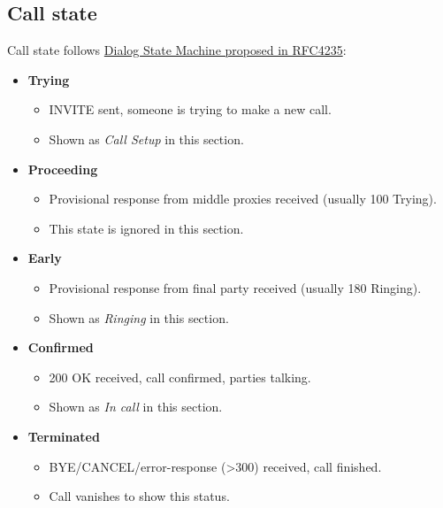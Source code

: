 \documentclass[letterpaper,10pt,spanish]{sphinxmanual}
\begin{document}
\subsection{Call state}
\label{administration_portal/platform/active_calls:call-state}
Call state follows \href{https://tools.ietf.org/html/rfc4235\#section-3.7.1}{Dialog State Machine proposed in RFC4235}:
\begin{itemize}
\item {} 
\textbf{Trying}
\begin{itemize}
\item {} 
INVITE sent, someone is trying to make a new call.

\item {} 
Shown as \emph{Call Setup} in this section.

\end{itemize}

\item {} 
\textbf{Proceeding}
\begin{itemize}
\item {} 
Provisional response from middle proxies received (usually 100 Trying).

\item {} 
This state is ignored in this section.

\end{itemize}

\item {} 
\textbf{Early}
\begin{itemize}
\item {} 
Provisional response from final party received (usually 180 Ringing).

\item {} 
Shown as \emph{Ringing} in this section.

\end{itemize}

\item {} 
\textbf{Confirmed}
\begin{itemize}
\item {} 
200 OK received, call confirmed, parties talking.

\item {} 
Shown as \emph{In call} in this section.

\end{itemize}

\item {} 
\textbf{Terminated}
\begin{itemize}
\item {} 
BYE/CANCEL/error-response (\textgreater{}300) received, call finished.

\item {} 
Call vanishes to show this status.

\end{itemize}

\end{itemize}
\end{document}
